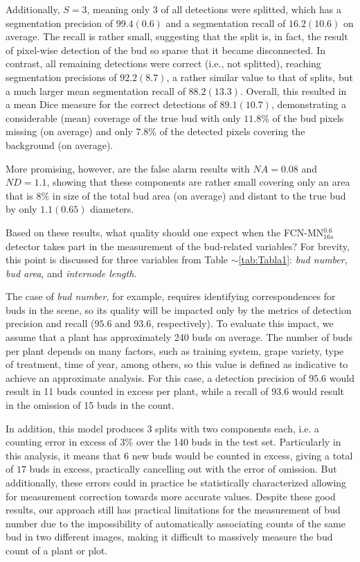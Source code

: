 \documentclass[a4paper,authoryear,review]{elsarticle}
\begin{document}
Additionally, $S=3$, meaning only $3$ of all detections were splitted, which has a segmentation precision of $99.4(0.6)$ and a segmentation recall of $16.2(10.6)$ on average. The recall is rather small, suggesting that the split is, in fact, the result of pixel-wise detection of the bud so sparse that it became disconnected. In contrast, all remaining detections were correct (i.e., not splitted), reaching segmentation precisions of $92.2(8.7)$, a rather similar value to that of splits, but a much larger mean segmentation recall of $88.2(13.3)$. Overall, this resulted in a mean Dice measure for the correct detections of $89.1(10.7)$, demonstrating a considerable (mean) coverage of the true bud with only $11.8\%$ of the bud pixels missing (on average) and only $7.8\%$ of the detected pixels covering the background (on average).

More promising, however, are the false alarm results with $NA=0.08$ and $ND=1.1$, showing that these components are rather small covering only an area that is $8\%$ in size of the total bud area (on average) and distant to the true bud by only $1.1 (0.65)$ diameters.

Based on these results, what quality should one expect when the FCN-MN$_{16s}^{0.6}$ detector takes part in the measurement of the bud-related variables? For brevity, this point is discussed for three variables from Table $\sim$\ref{tab:Tabla1}: \emph{bud number}, \emph{bud area}, and \emph{internode length}.

The case of \emph{bud number}, for example, requires identifying correspondences for buds in the scene, so its quality will be impacted only by the metrics of detection precision and recall ($95.6$ and $93.6$, respectively). To evaluate this impact, we assume that a plant has approximately 240 buds on average. The number of buds per plant depends on many factors, such as training system, grape variety, type of treatment, time of year, among others, so this value is defined as indicative to achieve an approximate analysis. For this case, a detection precision of $95.6$ would result in 11 buds counted in excess per plant, while a recall of $93.6$ would result in the omission of 15 buds in the count. 

In addition, this model produces 3 splits with two components each, i.e. a counting error in excess of $3\%$ over the 140 buds in the test set. Particularly in this analysis, it means that $6$ new buds would be counted in excess, giving a total of $17$ buds in excess, practically cancelling out with the error of omission. But additionally, these errors could in practice be statistically characterized allowing for measurement correction towards more accurate values. Despite these good results, our approach still has practical limitations for the measurement of bud number due to the impossibility of automatically associating counts of the same bud in two different images, making it difficult to massively measure the bud count of a plant or plot. 
\end{document}
